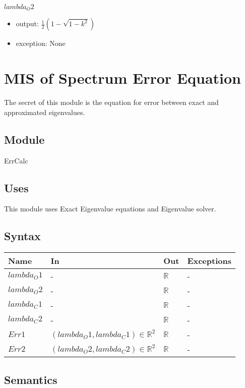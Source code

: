 \documentclass[12pt, titlepage]{article}
\begin{document}
\noindent $lambda_O2$
\begin{itemize} 
	\item output: $\frac{1}{2} (1-\sqrt{1-k^{2}})$ 
	\item exception: None
\end{itemize}


\newpage

\section{MIS of Spectrum Error Equation} 

The secret of this module is the equation for error between exact and 
approximated eigenvalues.

\subsection{Module}

ErrCalc

\subsection{Uses}

This module uses Exact Eigenvalue equations and Eigenvalue solver. 

\subsection{Syntax}

\begin{center}
	\begin{tabular}{p{3cm} p{6cm} p{3cm} >{\raggedright\arraybackslash}p{3cm}}
		\toprule
		\textbf{Name} & \textbf{In} & \textbf{Out} & \textbf{Exceptions} \\
		\hline
		$lambda_O1$ & - & $\mathbb{R}$ & - \\
		$lambda_O2$ & - & $\mathbb{R}$ & - \\ 
		$lambda_C1$ & - & $\mathbb{R}$ & - \\
		$lambda_C2$ & - & $\mathbb{R}$ & - \\
		$Err1$ & $(lambda_O1,lambda_C1)\in \mathbb{R}^{2}$ & $\mathbb{R}$ &- \\
		$Err2$ & $(lambda_O2,lambda_C2)\in \mathbb{R}^{2}$ & $\mathbb{R}$ &- \\
		\hline
	\end{tabular}
\end{center}

\subsection{Semantics}
\end{document}
